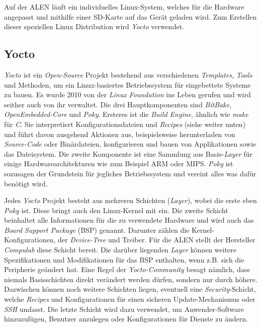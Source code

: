 Auf der ALEN läuft ein individuelles Linux-System, welches für die Hardware angepasst und mithilfe einer SD-Karte auf das Gerät geladen wird. Zum Erstellen dieser speziellen Linux Distribution wird \textit{Yocto} verwendet.

\subsection{Yocto}
\label{sec:yocto}

\textit{Yocto} \cite{Yocto20} ist ein \textit{Open-Source} Projekt bestehend aus verschiedenen \textit{Templates}, \textit{Tools} und Methoden, um ein Linux-basiertes Betriebssystem für eingebettete Systeme zu bauen. Es wurde 2010 von der \textit{Linux Foundation} ins Leben gerufen und wird seither auch von ihr verwaltet. Die drei Hauptkomponenten sind \textit{BitBake}, \textit{OpenEmbedded-Core} und \textit{Poky}. Ersteres ist die \textit{Build Engine}, ähnlich wie \textit{make} für \textit{C}. Sie interpretiert Konfigurationsdateien und \textit{Recipes} (siehe weiter unten) und führt davon ausgehend Aktionen aus, beispielsweise herunterladen von \textit{Source-Code} oder Binärdateien, konfigurieren und bauen von Applikationen sowie das Dateisystem. Die zweite Komponente ist eine Sammlung aus Basis-\textit{Layer} für einige Hardwarearchitekturen wie zum Beispiel ARM oder MIPS. \textit{Poky} ist sozusagen der Grundstein für jegliches Betriebssystem und vereint alles was dafür benötigt wird.

Jedes \textit{Yocto} Projekt besteht aus mehreren Schichten (\textit{Layer}), wobei die erste eben \textit{Poky} ist. Diese bringt auch den Linux-Kernel mit ein. Die zweite Schicht beinhaltet alle Informationen für die zu verwendete Hardware und wird auch das \textit{Board Support Package} (BSP) genannt. Darunter zählen die Kernel-Konfigurationen, der \textit{Device-Tree} und Treiber. Für die ALEN stellt der Hersteller \textit{Compulab} diese Schicht bereit. Die darüber liegenden \textit{Layer} können weitere Spezifikationen und Modifikationen für das BSP enthalten, wenn z.B. sich die Peripherie geändert hat. Eine Regel der \textit{Yocto-Community} besagt nämlich, dass niemals Basisschichten direkt verändert werden dürfen, sondern nur durch höhere. Dazwischen können noch weitere Schichten liegen, eventuell eine \textit{Security}-Schicht, welche \textit{Recipes} und Konfigurationen für einen sicheren Update-Mechanismus oder \textit{SSH} umfasst. Die letzte Schicht wird dazu verwendet, um Anwender-Software hinzuzufügen, Benutzer anzulegen oder Konfigurationen für Dienste zu ändern.


